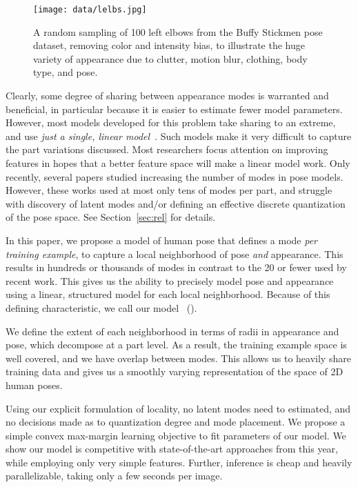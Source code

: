 \begin{figure}[b!]
\centering
\texttt{[image: data/lelbs.jpg]}
\caption{\small \label{fig:lelbs} A random sampling of 100 left elbows from the 
Buffy Stickmen pose dataset, removing color and intensity bias, to illustrate 
the huge variety of appearance due to clutter, motion blur, clothing, body 
type, and pose.}
\end{figure}

Clearly, some degree of sharing between appearance modes is warranted and 
beneficial, in particular because it is easier to estimate fewer model 
parameters.  However, most models developed for this problem take sharing to an 
extreme, and use {\em just a single, linear 
model}~\cite{devacrf,eichner09,sapp2010cascades,sapp2011,andriluka09,ddtran}.  
Such models make it very difficult to capture the part variations discussed.  
Most researchers focus attention on improving features in hopes that a better 
feature space will make a linear model work.  Only recently, several papers 
studied increasing the number of modes in pose models. However, these works 
used at most only tens of modes per part, and struggle with discovery of latent 
modes and/or defining an effective discrete quantization of the pose space.  
See Section~\ref{sec:rel} for details.


 In this paper, we propose a model of human pose that 
defines a mode {\em per training example}, to capture a local neighborhood of
pose {\em and } appearance.  This results in hundreds or thousands of modes in 
contrast to the 20 or fewer used by recent work. This gives us the ability to 
precisely model pose and appearance using a linear, structured model for each 
local neighborhood.  Because of this defining characteristic, we call our model 
\model~(\mdl).

We define the extent of each neighborhood in terms of radii in appearance and 
pose, which decompose at a part level.  As a result, the training example space 
is well covered, and we have overlap between modes.  This allows us to heavily 
share training data and gives us a smoothly varying representation of the space 
of 2D human poses.

Using our explicit formulation of locality, no latent modes need to estimated, 
and no decisions made as to quantization degree and mode placement.  We propose 
a simple convex max-margin learning objective to fit parameters of our model.  
We show our model is competitive with state-of-the-art approaches from this 
year, while employing only very simple features. Further, inference is cheap 
and heavily parallelizable, taking only a few seconds per image.


